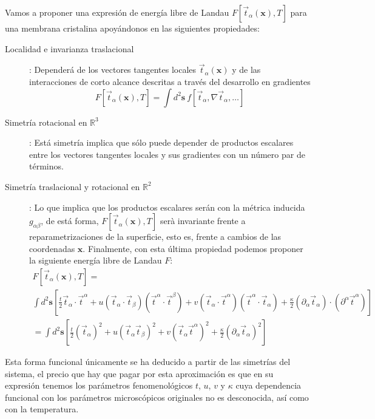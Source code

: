 Vamos a proponer una expresión de energía libre de Landau
$F[\vec{t}_{\alpha}(\mathbf{x}),T]$ para una membrana cristalina
apoyándonos en las siguientes propiedades:
\begin{description}
\item[Localidad e invarianza traslacional]: Dependerá de los vectores
  tangentes locales $\vec{t}_{\alpha}(\mathbf{x})$ y de las
  interacciones de corto alcance descritas a través del desarrollo en gradientes
  $$ F[\vec{t}_{\alpha}(\mathbf{x}),T]=\int\! d^2\mathbf{s}\ f[\vec{t}_{\alpha},\nabla
  \vec{t}_{\alpha},\dots]$$ 
\item[Simetría rotacional en $\mathbb{R}^3$]: Está simetría implica que sólo
  puede depender de productos escalares entre los vectores tangentes
  locales y sus gradientes con un número par de términos. 

\item[Simetría traslacional y rotacional en $\mathbb{R}^2$]: Lo que implica
  que los productos escalares serán con la métrica inducida $g_{\alpha\beta}$,
  de está forma, $F[\vec{t}_{\alpha}(\mathbf{x}),T]$ serà invariante frente a
  reparametrizaciones de la superficie, esto es, frente a cambios de 
  las coordenadas $\mathbf{x}$. Finalmente, con esta última
  propiedad podemos proponer la siguiente energía libre de Landau $F$:
  \begin{multline}\label{ELandau}
    F[\vec{t}_{\alpha}(\mathbf{x}),T]=\\
\int d^2\mathbf{s}
    \left[
      \frac{t}{2}\vec{t}_{\alpha}\cdot\vec{t}^{\alpha}+
      u(\vec{t}_{\alpha}\cdot\vec{t}_{\beta})(\vec{t}^{\alpha}\cdot\vec{t}^{\beta})+
      v(\vec{t}_{\alpha}\cdot\vec{t}^{\alpha})(\vec{t}^{\alpha}\cdot\vec{t}_{\alpha})+
      \frac{\kappa}{2}(\partial_{\alpha}\vec{t}_{\alpha})\cdot(\partial^{\alpha}\vec{t}^{\alpha}) \right]\\
=\int d^2\mathbf{s}
    \left[
      \frac{t}{2}(\vec{t}_{\alpha})^2+
      u(\vec{t}_{\alpha}\vec{t}_{\beta})^2+
      v(\vec{t}_{\alpha}\vec{t}^{\alpha})^2+
      \frac{\kappa}{2}(\partial_{\alpha}\vec{t}_{\alpha})^2
    \right]
  \end{multline}
\end{description}

Esta forma funcional únicamente se ha deducido a partir de las simetrías del
sistema, el precio que hay que pagar por esta aproximación es que en su
expresión tenemos los parámetros fenomenológicos $t$, $u$, $v$ y $\kappa$ cuya
dependencia funcional con los parámetros microscópicos originales no es
desconocida, así como con la temperatura.



